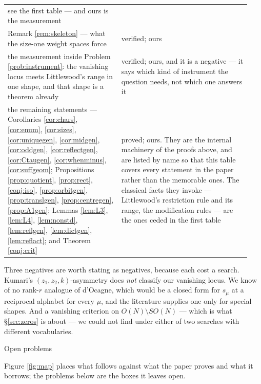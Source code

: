 \documentclass[11pt,reqno]{amsart}
\makeatletter
\newcommand{\stproved}{\textcolor{hproved}{\small proved}}
\newcommand{\stverif}{\textcolor{hverif}{\small verified}}
\renewcommand\section{\@startsection{section}{1}%
  \z@{\linespacing\@plus\linespacing}{.5\linespacing}%
  {\normalfont\large\bfseries\centering}}
\theoremstyle{plain}
\theoremstyle{definition}
\makeatother
\begin{document}
\begin{longtable}{@{}>{\raggedright\arraybackslash}p{0.44\linewidth}%
                   >{\raggedright\arraybackslash}p{0.50\linewidth}@{}}
see the first table --- and ours is the measurement\\
Remark \ref{rem:skeleton} --- what the size-one weight spaces force & \stverif; ours\\
the measurement inside Problem \ref{prob:instrument}: the vanishing locus meets
Littlewood's range in one shape, and that shape is a theorem already & \stverif;
ours, and it is a negative --- it says which kind of instrument the question needs,
not which one answers it\\
the remaining statements --- Corollaries \ref{cor:chars}, \ref{cor:enum}, \ref{cor:sizes},
\ref{cor:uniquegen}, \ref{cor:midgen}, \ref{cor:oddgen}, \ref{cor:reflectgen}, \ref{cor:Ctaugen},
\ref{cor:whenminus}, \ref{cor:suffgeom}; Propositions \ref{prop:quotient}, \ref{prop:rect},
\ref{conj:iso}, \ref{prop:orbitgen}, \ref{prop:translgen}, \ref{prop:centregen}, \ref{prop:A1gen};
Lemmas \ref{lem:L3}, \ref{lem:L4}, \ref{lem:nonstd}, \ref{lem:reflgen}, \ref{lem:dictgen},
\ref{lem:reflact}; and Theorem \ref{conj:crit} & \stproved; ours. They are the internal machinery of
the proofs above, and are listed by name so that this table covers every statement in the paper
rather than the memorable ones. The classical facts they invoke --- Littlewood's restriction rule and
its range, the modification rules --- are the ones ceded in the first table\\
\bottomrule
\end{longtable}
\endgroup

\noindent
Three negatives are worth stating as negatives, because each cost a search. Kumari's
$(z_1,z_2,k)$-asymmetry does \emph{not} classify our vanishing locus. We know of no rank-$r$ analogue
of d'Ocagne, which would be a closed form for $s_\mu$ at a reciprocal alphabet for every $\mu$, and
the literature supplies one only for special shapes. And a vanishing criterion on
$O(N)\setminus SO(N)$ --- which is what \S\ref{sec:zeros} is about --- we could not find under either
of two searches with different vocabularies.

\section{Open problems}\label{sec:open}

Figure \ref{fig:map} places what follows against what the paper proves and what it borrows;
the problems below are the boxes it leaves open.
\end{document}
